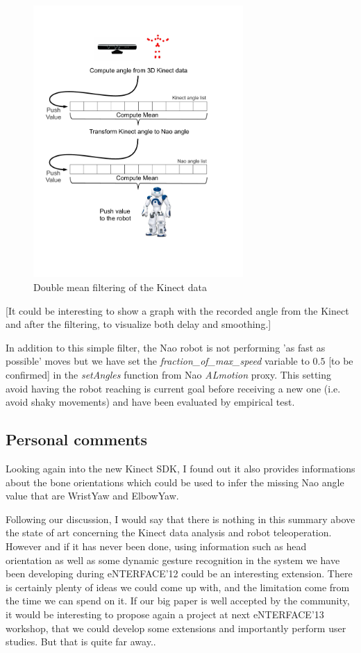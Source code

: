 \documentclass[a4paper,11pt]{article}
\newcommand{\todo}[1]{{\small\color{red}[#1]}}
\begin{document}
\begin{figure}[H]
	\centering
	\includegraphics[width=8cm]{filter.pdf}
	\caption{Double mean filtering of the Kinect data}
	\label{filter}
\end{figure}

\todo{It could be interesting to show a graph with the recorded angle from the Kinect and after the filtering, to visualize both delay and smoothing.}

In addition to this simple filter, the Nao robot is not performing 'as fast as possible' moves but we have set the \emph{fraction\_of\_max\_speed} variable to $0.5$ \todo{to be confirmed} in the \emph{setAngles} function from Nao \emph{ALmotion} proxy. This setting avoid having the robot reaching is current goal before receiving a new one (i.e. avoid shaky movements) and have been evaluated by empirical test.

\subsection{Personal comments}

Looking again into the new Kinect SDK, I found out it also provides informations about the bone orientations which could be used to infer the missing Nao angle value that are WristYaw and ElbowYaw.

Following our discussion, I would say that there is nothing in this summary above the state of art concerning the Kinect data analysis and robot teleoperation. However and if it has never been done, using information such as head orientation as well as some dynamic gesture recognition in the system we have been developing during eNTERFACE'12 could be an interesting extension. 
There is certainly plenty of ideas we could come up with, and the limitation come from the time we can spend on it.  If our big paper is well accepted by the community, it would be interesting to propose again a project at next eNTERFACE'13 workshop, that we could develop some extensions and importantly perform user studies. But that is quite far away..
\end{document}
